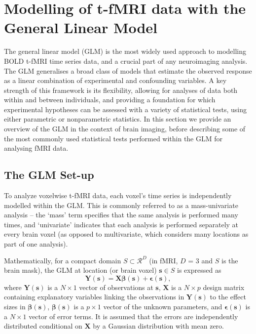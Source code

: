 \section{Modelling of t-fMRI data with the General Linear Model}

The general linear model (GLM) is the most widely used approach to modelling BOLD t-fMRI time series data, and a crucial part of any neuroimaging analysis. The GLM generalises a broad class of models that estimate the observed response as a linear combination of experimental and confounding variables. A key strength of this framework is its flexibility, allowing for analyses of data both within and between individuals, and providing a foundation for which experimental hypotheses can be assessed with a variety of statistical tests, using either parametric or nonparametric statistics. In this section we provide an overview of the GLM in the context of brain imaging, before describing some of the most commonly used statistical tests performed within the GLM for analysing fMRI data.


\subsection{The GLM Set-up}
\label{sec:GLM}
To analyze voxelwise t-fMRI data, each voxel's time series is independently modelled within the GLM. This is commonly referred to as a mass-univariate analysis -- the `mass' term specifies that the same analysis is performed many times, and `univariate' indicates that each analysis is performed separately at every brain voxel (as opposed to multivariate, which considers many locations as part of one analysis). 

Mathematically, for a compact domain $S \subset \mathcal{R}^{D}$ (in fMRI, $D$ = 3 and $S$ is the brain mask), the GLM at location (or brain voxel) $\bm{s} \in S$ is expressed as
\begin{equation}
\label{eq:GLM}
\bm{Y}(\bm{s}) = \bm{X}\bm{\beta}(\bm{s}) + \bm{\epsilon}(\bm{s}),
\end{equation}
where $\bm{Y}(\bm{s})$ is a $N \times 1$ vector of observations at $\bm{s}$, $\bm{X}$ is a $N \times p$ design matrix containing explanatory variables linking the observations in $\bm{Y}(\bm{s})$ to the effect sizes in $\bm{\beta}(\bm{s})$, $\bm{\beta}(\bm{s})$ is a $p \times 1$ vector of the unknown parameters, and $\bm{\epsilon}(\bm{s})$ is a $N \times 1$ vector of error terms. It is assumed that the errors are independently distributed conditional on $\bm{X}$ by a Gaussian distribution with mean zero.

